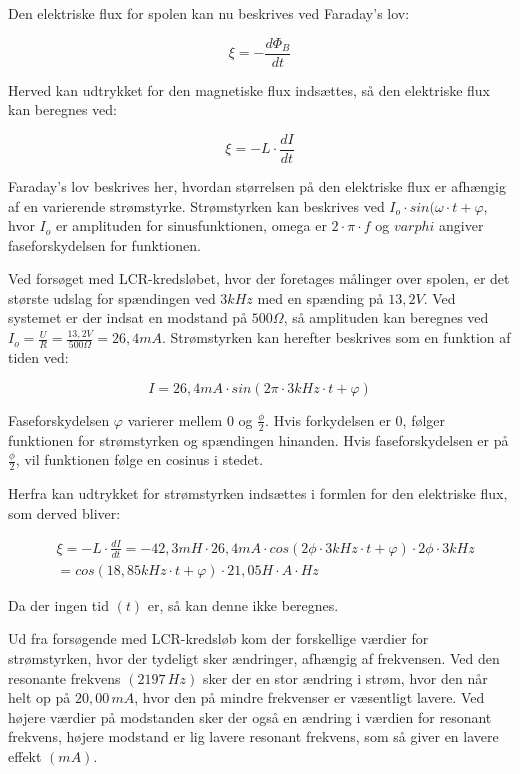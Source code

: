 Den elektriske flux for spolen kan nu beskrives ved Faraday's lov:

\begin{equation}
\xi = - \frac{d\Phi_B}{dt}
\end{equation}

Herved kan udtrykket for den magnetiske flux indsættes, så den elektriske flux kan beregnes ved:

\begin{equation}
\xi = - L \cdot \frac{dI}{dt}
\end{equation}

Faraday's lov beskrives her, hvordan størrelsen på den elektriske flux er afhængig af en varierende strømstyrke. Strømstyrken kan beskrives ved $I_o \cdot sin(\omega \cdot t + \varphi$, hvor $I_o$ er amplituden for sinusfunktionen, omega er $2 \cdot \pi \cdot f$ og $varphi$ angiver faseforskydelsen for funktionen.

Ved forsøget med LCR-kredsløbet, hvor der foretages målinger over spolen, er det største udslag for spændingen ved $3 kHz$ med en spænding på $13,2 V$. Ved systemet er der indsat en modstand på $500 \Omega$, så amplituden kan beregnes ved $I_o = \frac{U}{R} = \frac{13,2 V}{500 \Omega} = 26,4 mA$. Strømstyrken kan herefter beskrives som en funktion af tiden ved:

\begin{equation}
I = 26,4 mA \cdot sin(2 \pi \cdot 3 kHz \cdot t + \varphi)
\end{equation}

Faseforskydelsen $\varphi$ varierer mellem 0 og $\frac{\phi}{2}$. Hvis forkydelsen er 0, følger funktionen for strømstyrken og spændingen hinanden. Hvis faseforskydelsen er på $\frac{\phi}{2}$, vil funktionen følge en cosinus i stedet.

Herfra kan udtrykket for strømstyrken indsættes i formlen for den elektriske flux, som derved bliver:

\begin{equation}
\begin{aligned}
&\xi = - L \cdot \frac{dI}{dt} = - 42,3 mH \cdot 26,4 mA \cdot cos(2 \phi \cdot 3 kHz \cdot t +\varphi) \cdot 2 \phi \cdot 3 kHz \\
&= cos(18,85 kHz \cdot t + \varphi) \cdot 21,05 H \cdot A \cdot Hz
\end{aligned}
\end{equation}

Da der ingen tid $(t)$ er, så kan denne ikke beregnes. 

Ud fra forsøgende med LCR-kredsløb kom der forskellige værdier for strømstyrken, hvor der tydeligt sker ændringer, afhængig af frekvensen. Ved den resonante frekvens $(2197 \, Hz)$ sker der en stor ændring i strøm, hvor den når helt op på $20,00 \, mA$, hvor den på mindre frekvenser er væsentligt lavere. Ved højere værdier på modstanden sker der også en ændring i værdien for resonant frekvens, højere modstand er lig lavere resonant frekvens, som så giver en lavere effekt $(mA)$.

\newpage
